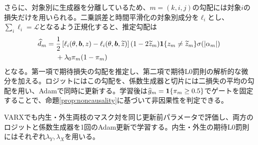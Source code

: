 さらに、対象別に生成器を分離しているため、\(m=(k,i,j)\)の勾配には対象\(i\)の損失だけを用いられる。二乗誤差と時間平滑化の対象別成分を\(\ell_i\)とし、\(\sum_i\ell_i=\mathcal L\)となるよう正規化すると、推定勾配は
\begin{align}
 \widehat d_m={}&
 \frac12\left[\ell_i(\theta,\bm b,z)-\ell_i(\theta,\bm b,\widetilde z)\right]
 (1-2\widetilde z_m)\mathbf{1}\{z_m\ne\widetilde z_m\}
 \sigma(|\alpha_m|)\notag\\
 &+\lambda_0\pi_m(1-\pi_m)
 \label{eq:disarm}
\end{align}
となる。第一項で期待損失の勾配を推定し、第二項で期待L0罰則の解析的な微分を加える。ロジットにはこの勾配を、係数生成器と切片には二損失の平均の勾配を用い、Adamで同時に更新する。学習後は\(\widehat g_m=\mathbf{1}\{\pi_m\ge0.5\}\)でゲートを固定することで、命題\ref{prop:noncausality}に基づいて非因果性を判定できる。



VARXでも内生・外生両枝のマスク対を同じ更新前パラメータで評価し、両方のロジットと係数生成器を1回のAdam更新で学習する。内生・外生の期待L0罰則にはそれぞれ\(\lambda_Y,\lambda_X\)を用いる。
